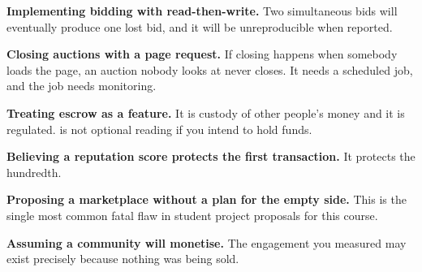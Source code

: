 \begin{pitfall}
\begin{tight}
  \item \textbf{Implementing bidding with read-then-write.} Two simultaneous
        bids will eventually produce one lost bid, and it will be
        unreproducible when reported.
  \item \textbf{Closing auctions with a page request.} If closing happens when
        somebody loads the page, an auction nobody looks at never closes. It
        needs a scheduled job, and the job needs monitoring.
  \item \textbf{Treating escrow as a feature.} It is custody of other people's
        money and it is regulated.  is not optional reading if you
        intend to hold funds.
  \item \textbf{Believing a reputation score protects the first transaction.}
        It protects the hundredth.
  \item \textbf{Proposing a marketplace without a plan for the empty side.}
        This is the single most common fatal flaw in student project proposals
        for this course.
  \item \textbf{Assuming a community will monetise.} The engagement you measured
        may exist precisely because nothing was being sold.
\end{tight}
\end{pitfall}

